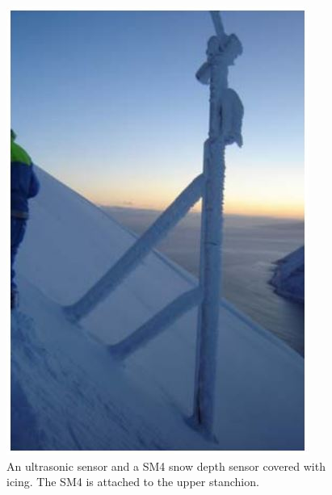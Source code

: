  \begin{figure}[!t]
    \centering
    \includegraphics[width=0.8\linewidth]{figures/SM4.JPG}
    \caption{An ultrasonic sensor and a SM4 snow depth sensor covered with icing. The SM4 is attached to the upper stanchion.}
    \label{fig:SM4}
 \end{figure}
 
